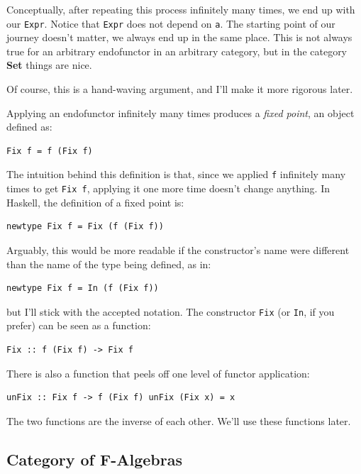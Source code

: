 Conceptually, after repeating this process infinitely many times, we end
up with our \texttt{Expr}. Notice that \texttt{Expr} does not depend on
\texttt{a}. The starting point of our journey doesn't matter, we always
end up in the same place. This is not always true for an arbitrary
endofunctor in an arbitrary category, but in the category \textbf{Set}
things are nice.

Of course, this is a hand-waving argument, and I'll make it more
rigorous later.

Applying an endofunctor infinitely many times produces a \emph{fixed
point}, an object defined as:

\begin{verbatim}
Fix f = f (Fix f)
\end{verbatim}

The intuition behind this definition is that, since we applied
\texttt{f} infinitely many times to get \texttt{Fix\ f}, applying it one
more time doesn't change anything. In Haskell, the definition of a fixed
point is:

\begin{verbatim}
newtype Fix f = Fix (f (Fix f))
\end{verbatim}

Arguably, this would be more readable if the constructor's name were
different than the name of the type being defined, as in:

\begin{verbatim}
newtype Fix f = In (f (Fix f))
\end{verbatim}

but I'll stick with the accepted notation. The constructor \texttt{Fix}
(or \texttt{In}, if you prefer) can be seen as a function:

\begin{verbatim}
Fix :: f (Fix f) -> Fix f
\end{verbatim}

There is also a function that peels off one level of functor
application:

\begin{verbatim}
unFix :: Fix f -> f (Fix f) unFix (Fix x) = x
\end{verbatim}

The two functions are the inverse of each other. We'll use these
functions later.

\subsection{Category of F-Algebras}\label{category-of-f-algebras}

